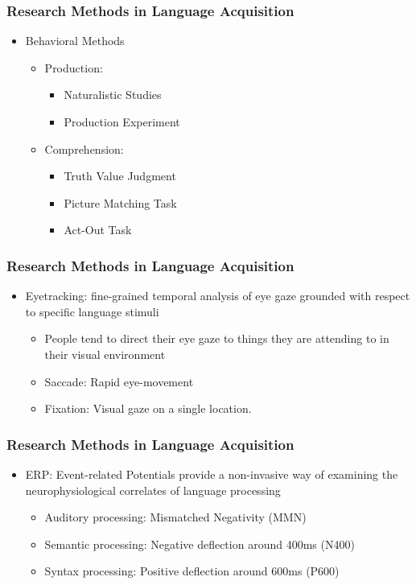 \documentclass{beamer}
\begin{document}
\begin{frame}
\frametitle{Research Methods in Language Acquisition}
\begin{itemize}
\item Behavioral Methods
\pause
\begin{itemize}
    \item Production:
    \pause
    \begin{itemize}
        \item Naturalistic Studies
        \item Production Experiment
    \end{itemize}
    \pause
    \item Comprehension:
    \pause
    \begin{itemize}
        \item Truth Value Judgment
        \item Picture Matching Task
        \item Act-Out Task
    \end{itemize}
\end{itemize}
\end{itemize}
\end{frame}
\begin{frame}
\frametitle{Research Methods in Language Acquisition}
\begin{itemize}
\item Eyetracking: fine-grained temporal analysis of eye gaze grounded with respect to specific language stimuli
\pause 
\begin{itemize}
    \item People tend to direct their eye gaze to things they are attending to in their visual environment
    \item Saccade: Rapid eye-movement
    \item Fixation: Visual gaze on a single location.
\end{itemize}
\end{itemize}
\end{frame}
\begin{frame}
\frametitle{Research Methods in Language Acquisition}
\begin{itemize}
\item ERP: Event-related Potentials  provide a non-invasive way of examining the neurophysiological correlates of language processing
\pause
\begin{itemize}
    \item Auditory processing:
    \pause
    Mismatched Negativity (MMN)
    \pause
    \item Semantic processing:
    \pause 
    Negative deflection around 400ms (N400)
    \pause
    \item Syntax processing:
    \pause
    Positive deflection around 600ms (P600)
\end{itemize}
\end{itemize}
\end{frame}
\end{document}
